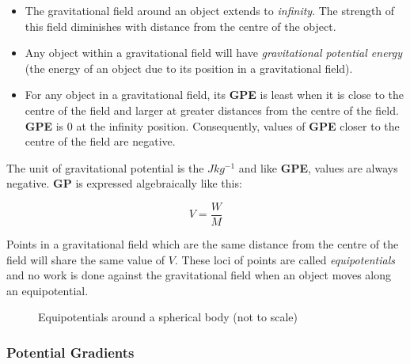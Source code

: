 \documentclass[12pt]{article}
\begin{document}
\begin{itemize}
\item The gravitational field around an object extends to \emph{infinity}. The strength of this field diminishes with distance from the centre of the object.

\item Any object within a gravitational field will have \emph{gravitational potential energy} (the energy of an object due to its position in a gravitational field).

\item For any object in a gravitational field, its \textbf{GPE} is least when it is close to the centre of the field and larger at greater distances from the centre of the field. \textbf{GPE} is \(0\) at the infinity position. Consequently, values of \textbf{GPE} closer to the centre of the field are negative.
\end{itemize}

The unit of gravitational potential is the \(Jkg^{-1}\) and like \textbf{GPE}, values are always negative. \textbf{GP} is expressed algebraically like this:

\[V = \dfrac{W}{M}\]

Points in a gravitational field which are the same distance from the centre of the field will share the same value of \(V\). These loci of points are called \emph{equipotentials} and no work is done against the gravitational field when an object moves along an equipotential.


\begin{figure}[H]
\centering
{}
\caption{Equipotentials around a spherical body (not to scale)}
\end{figure}

\subsubsection{Potential Gradients}
\label{sec:org47da66d}
\end{document}
